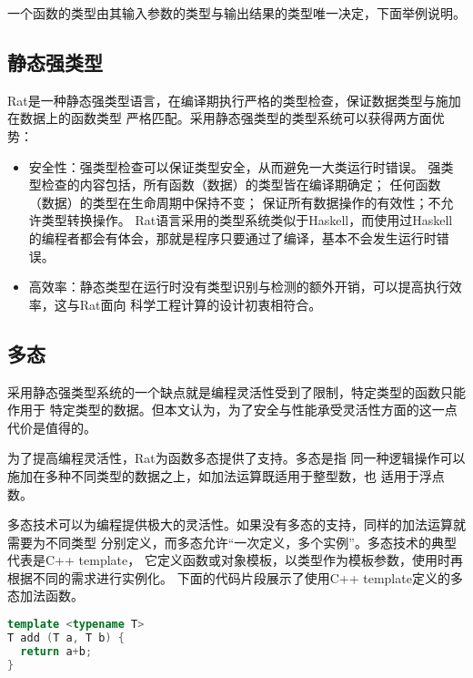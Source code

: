 一个函数的类型由其输入参数的类型与输出结果的类型唯一决定，下面举例说明。

\begin{quotation}
\end{quotation}

\subsection{静态强类型}
Rat是一种静态强类型语言，在编译期执行严格的类型检查，保证数据类型与施加在数据上的函数类型
严格匹配。采用静态强类型的类型系统可以获得两方面优势：
\begin{itemize}
  \item 安全性：强类型检查可以保证类型安全，从而避免一大类运行时错误。
    强类型检查的内容包括，所有函数（数据）的类型皆在编译期确定；
    任何函数（数据）的类型在生命周期中保持不变；
    保证所有数据操作的有效性；不允许类型转换操作。
    Rat语言采用的类型系统类似于Haskell，而使用过Haskell
    的编程者都会有体会，那就是程序只要通过了编译，基本不会发生运行时错误。
  \item 高效率：静态类型在运行时没有类型识别与检测的额外开销，可以提高执行效率，这与Rat面向
    科学工程计算的设计初衷相符合。
\end{itemize}

\subsection{多态}
采用静态强类型系统的一个缺点就是编程灵活性受到了限制，特定类型的函数只能作用于
特定类型的数据。但本文认为，为了安全与性能承受灵活性方面的这一点代价是值得的。

为了提高编程灵活性，Rat为函数多态提供了支持。多态是指
同一种逻辑操作可以施加在多种不同类型的数据之上，如加法运算既适用于整型数，也
适用于浮点数。

多态技术可以为编程提供极大的灵活性。如果没有多态的支持，同样的加法运算就需要为不同类型
分别定义，而多态允许“一次定义，多个实例”。多态技术的典型代表是C++ template，
它定义函数或对象模板，以类型作为模板参数，使用时再根据不同的需求进行实例化。
下面的代码片段展示了使用C++ template定义的多态加法函数。
\begin{lstlisting}[language=C++]
template <typename T>
T add (T a, T b) {
  return a+b;
}
\end{lstlisting}

